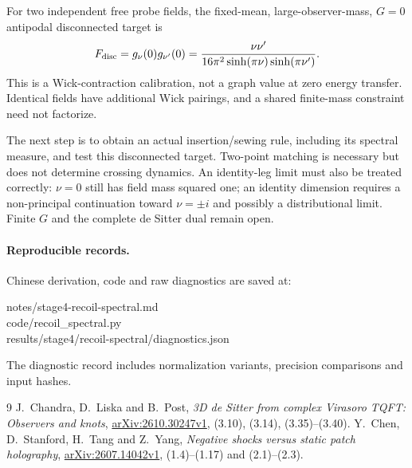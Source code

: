 \documentclass[11pt,a4paper]{article}
\begin{document}
For two independent free probe fields, the fixed-mean,
large-observer-mass, \(G=0\) antipodal disconnected target is
\begin{equation}
F_{\rm disc}=g_\nu(0)g_{\nu'}(0)
=\frac{\nu\nu'}{16\pi^2\sinh(\pi\nu)\sinh(\pi\nu')}.
\end{equation}
This is a Wick-contraction calibration, not a graph value at zero
energy transfer. Identical fields have additional Wick pairings,
and a shared finite-mass constraint need not factorize.

The next step is to obtain an actual insertion/sewing rule,
including its spectral measure, and test this disconnected target.
Two-point matching is necessary but does not determine crossing
dynamics. An identity-leg limit must also be treated correctly:
\(\nu=0\) still has field mass squared one; an identity dimension
requires a non-principal continuation toward \(\nu=\pm i\) and
possibly a distributional limit. Finite \(G\) and the complete
de Sitter dual remain open.

\paragraph{Reproducible records.}
Chinese derivation, code and raw diagnostics are saved at:
\begin{flushleft}\small
notes/stage4-recoil-spectral.md\\
code/recoil\_spectral.py\\
results/stage4/recoil-spectral/diagnostics.json
\end{flushleft}
The diagnostic record includes normalization variants, precision
comparisons and input hashes.
\begin{thebibliography}{9}
J.~Chandra, D.~Liska and B.~Post,
\emph{3D de Sitter from complex Virasoro TQFT: Observers and knots},
\href{https://arxiv.org/abs/2610.30247v1}{arXiv:2610.30247v1},
(3.10), (3.14), (3.35)--(3.40).
Y.~Chen, D.~Stanford, H.~Tang and Z.~Yang,
\emph{Negative shocks versus static patch holography},
\href{https://arxiv.org/abs/2607.14042v1}{arXiv:2607.14042v1},
(1.4)--(1.17) and (2.1)--(2.3).
\end{thebibliography}
\end{document}
